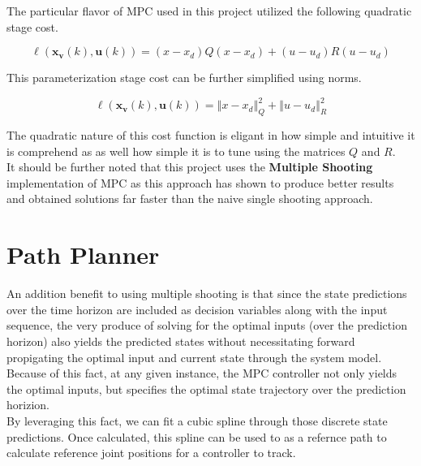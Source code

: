 \documentclass[journal]{IEEEtran}
\begin{document}
The particular flavor of MPC used in this project utilized the following quadratic stage cost.

\begin{equation}
  \ell\left(\mathbf{x}_{\mathbf{v}}(k), \mathbf{u}(k)\right) = (x-x_d)Q(x-x_d) + (u-u_d)R(u-u_d)
\end{equation}

This parameterization stage cost can be further simplified using norms.


\begin{equation}
  \ell\left(\mathbf{x}_{\mathbf{v}}(k), \mathbf{u}(k)\right) = \left\Vert x - x_d \right\Vert^{2}_{Q} + \left\Vert u -u_d \right\Vert^{2}_{R}
\end{equation}

The quadratic nature of this cost function is eligant in how simple and intuitive it is comprehend as as well how simple it is to tune using the matrices $Q$ and $R$. \\

It should be further noted that this project uses the \textbf{Multiple Shooting} implementation of MPC as this approach has shown to produce better results and obtained solutions far faster than the naive single shooting approach.




\section{Path Planner}

An addition benefit to using multiple shooting is that since the state predictions over the time horizon are included as decision variables along with the input sequence, the very produce of solving for the optimal inputs (over the prediction horizon) also yields the predicted states without necessitating forward propigating the optimal input and current state through the system model.\\

Because of this fact, at any given instance, the MPC controller not only yields the optimal inputs, but specifies the optimal state trajectory over the prediction horizion. \\

By leveraging this fact, we can fit a cubic spline through those discrete state predictions. Once calculated, this spline can be used to as a refernce path to calculate reference joint positions for a controller to track. \\
\end{document}
